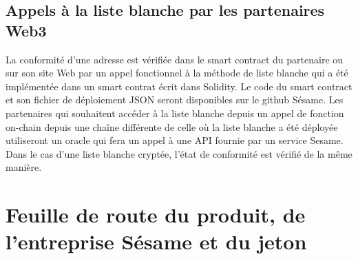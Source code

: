 ﻿\documentclass[a4paper]{article}
\begin{document}
\subsection{Appels à la liste blanche par les partenaires Web3}
La conformité d’une adresse est vérifiée dans le smart contract du partenaire ou sur son site Web par un appel fonctionnel à la méthode de liste blanche qui a été implémentée dans un smart contrat écrit dans Solidity. Le code du smart contract et son fichier de déploiement JSON seront disponibles sur le github Sésame.
Les partenaires qui souhaitent accéder à la liste blanche depuis un appel de fonction on-chain depuis une chaîne différente de celle où la liste blanche a été déployée utiliseront un oracle qui fera un appel à une API fournie par un service Sesame.
Dans le cas d'une liste blanche cryptée, l'état de conformité est vérifié de la même manière.

\newpage
\section{Feuille de route du produit, de l’entreprise Sésame et du jeton }
\end{document}
